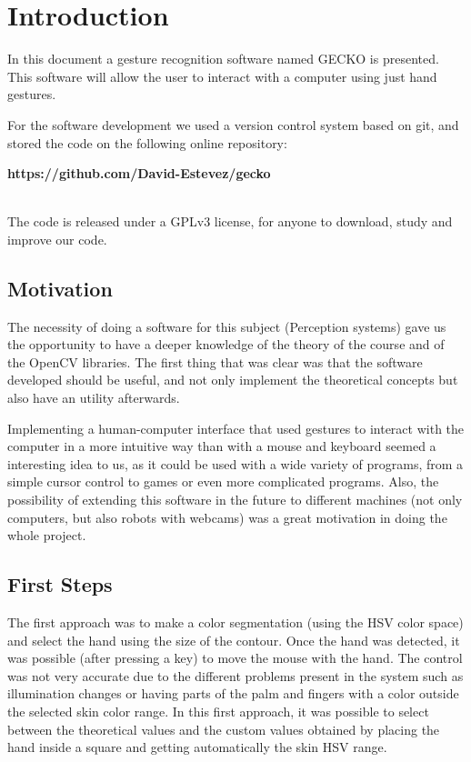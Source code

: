 \section{Introduction}
In this document a gesture recognition software named GECKO is presented. This software will allow the user to interact with a computer using just hand gestures. 

For the software development we used a version control system based on git, and stored the code on the following online repository:

\begin{center}
{\bfseries https://github.com/David-Estevez/gecko}
\end{center}
~\\
\noindent
The code is released under a GPLv3 license, for anyone to download, study and improve our code.

\subsection{Motivation}
The necessity of doing a software for this subject (Perception systems) gave us the opportunity to have a deeper knowledge of the theory of the course and of the OpenCV libraries. The first thing that was clear was that the software developed should be useful, and not only implement the theoretical concepts but also have an utility afterwards.

Implementing a human-computer interface that used gestures to interact with the computer in a more intuitive way than with a mouse and keyboard seemed a interesting idea to us, as it could be used with a wide variety of programs, from a simple cursor control to games or even more complicated programs. Also, the possibility of extending this software in the future to different machines (not only computers, but also robots with webcams) was a great motivation in doing the whole project. 

\subsection{First Steps}

The first approach was to make a color segmentation (using the HSV color space) and select the hand using the size of the contour. Once the hand was detected, it was possible (after pressing a key) to move the mouse with the hand. The control was not very accurate due to the different problems present in the system such as illumination changes or having parts of the palm and fingers with a color outside the selected skin color range. In this first approach, it was possible to select between the theoretical values and the custom values obtained by placing the hand inside a square and getting automatically the skin HSV range. 

